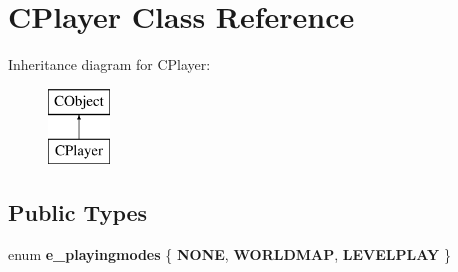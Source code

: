 \hypertarget{class_c_player}{
\section{CPlayer Class Reference}
\label{class_c_player}
}
Inheritance diagram for CPlayer:\begin{figure}[H]
\begin{center}
\leavevmode
\includegraphics[height=2cm]{class_c_player}
\end{center}
\end{figure}
\subsection*{Public Types}
\begin{DoxyCompactItemize}
\item 
enum {\bfseries e\_\-playingmodes} \{ {\bfseries NONE}, 
{\bfseries WORLDMAP}, 
{\bfseries LEVELPLAY}
 \}
\end{DoxyCompactItemize}
